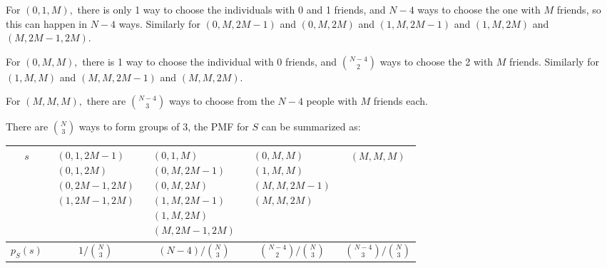 \documentclass{article}
\begin{document}
\begin{enumerate}
\begin{enumerate}[(a)]
\begin{soln}
					For $(0, 1, M),$ there is only 1 way to choose the individuals with 0 and 1 friends, and $N-4$ ways to choose the one with $M$ friends, so this can happen in $N-4$ ways. Similarly for $(0, M, 2M-1)$ and $(0, M, 2M)$ and $(1, M, 2M-1)$ and $(1, M, 2M)$ and $(M, 2M-1, 2M).$

					For $(0, M, M),$ there is 1 way to choose the individual with 0 friends, and $\binom{N-4}{2}$ ways to choose the 2 with $M$ friends. Similarly for $(1, M, M)$ and $(M, M, 2M-1)$ and $(M, M, 2M).$ 

					For $(M, M, M),$ there are $\binom{N-4}{3}$ ways to choose from the $N-4$ people with $M$ friends each. 

					There are $\binom{N}{3}$ ways to form groups of 3, the PMF for $S$ can be summarized as:
					\begin{center}
						\begin{tabular}{c||c|c|c|c}
							$s$ & $\begin{matrix}
								(0, 1, 2M-1) \\
								(0, 1, 2M) \\
								(0, 2M-1, 2M) \\
								(1, 2M-1, 2M)
							\end{matrix}$ & $\begin{matrix}
								(0, 1, M) \\
								(0, M, 2M-1) \\
								(0, M, 2M) \\
								(1, M, 2M-1) \\
								(1, M, 2M) \\
								(M, 2M-1, 2M)
							\end{matrix}$ & $\begin{matrix}
								(0, M, M) \\
								(1, M, M) \\
								(M, M, 2M-1) \\
								(M, M, 2M)
							\end{matrix}$ & $(M, M, M)$ \\
							\hline
							$p_S(s)$ & $1/\binom{N}{3}$ & $(N-4)/\binom{N}{3}$ & $\binom{N-4}{2}/\binom{N}{3}$ & $\binom{N-4}{3}/\binom{N}{3}$
						\end{tabular}
					\end{center}

				\end{soln}


\end{enumerate}
\end{enumerate}
\end{document}
